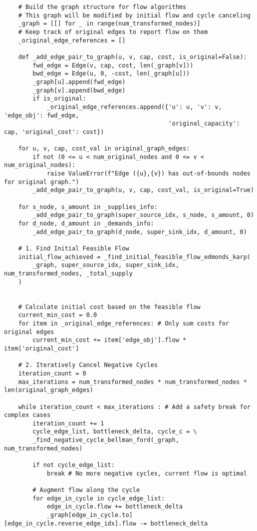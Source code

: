\begin{verbatim}
    # Build the graph structure for flow algorithms
    # This graph will be modified by initial flow and cycle canceling
    _graph = [[] for _ in range(num_transformed_nodes)]
    # Keep track of original edges to report flow on them
    _original_edge_references = [] 

    def _add_edge_pair_to_graph(u, v, cap, cost, is_original=False):
        fwd_edge = Edge(v, cap, cost, len(_graph[v]))
        bwd_edge = Edge(u, 0, -cost, len(_graph[u])) 
        _graph[u].append(fwd_edge)
        _graph[v].append(bwd_edge)
        if is_original:
            _original_edge_references.append({'u': u, 'v': v, 'edge_obj': fwd_edge, 
                                              'original_capacity': cap, 'original_cost': cost})

    for u, v, cap, cost_val in original_graph_edges:
        if not (0 <= u < num_original_nodes and 0 <= v < num_original_nodes):
            raise ValueError(f"Edge ({u},{v}) has out-of-bounds nodes for original graph.")
        _add_edge_pair_to_graph(u, v, cap, cost_val, is_original=True)

    for s_node, s_amount in _supplies_info:
        _add_edge_pair_to_graph(super_source_idx, s_node, s_amount, 0)
    for d_node, d_amount in _demands_info:
        _add_edge_pair_to_graph(d_node, super_sink_idx, d_amount, 0)
    
    # 1. Find Initial Feasible Flow
    initial_flow_achieved = _find_initial_feasible_flow_edmonds_karp(
        _graph, super_source_idx, super_sink_idx, num_transformed_nodes, _total_supply
    )


    # Calculate initial cost based on the feasible flow
    current_min_cost = 0.0
    for item in _original_edge_references: # Only sum costs for original edges
        current_min_cost += item['edge_obj'].flow * item['original_cost']
    
    # 2. Iteratively Cancel Negative Cycles
    iteration_count = 0
    max_iterations = num_transformed_nodes * num_transformed_nodes * len(original_graph_edges)
    
    while iteration_count < max_iterations : # Add a safety break for complex cases
        iteration_count += 1
        cycle_edge_list, bottleneck_delta, cycle_c = \
        _find_negative_cycle_bellman_ford(_graph, num_transformed_nodes)

        if not cycle_edge_list:
            break # No more negative cycles, current flow is optimal

        # Augment flow along the cycle
        for edge_in_cycle in cycle_edge_list:
            edge_in_cycle.flow += bottleneck_delta
            _graph[edge_in_cycle.to][edge_in_cycle.reverse_edge_idx].flow -= bottleneck_delta
        

\end{verbatim}
